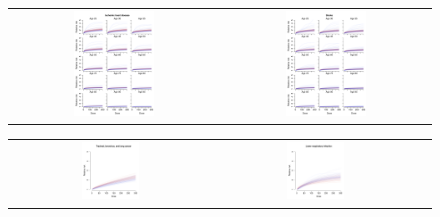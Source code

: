 \documentclass{article}
\begin{document}
\begin{appendix}
\begin{figure}[H]
\centering
\begin{tabular}{cc}
\includegraphics[width=0.4\textwidth]{cvd_ihdDR-sim.pdf}&
\includegraphics[width=0.4\textwidth]{cvd_strokeDR-sim.pdf}\\
\end{tabular}
\begin{tabular}{ccc}
\includegraphics[width=0.3\textwidth]{neo_lungDR-sim.pdf}&
\includegraphics[width=0.3\textwidth]{lriDR-sim.pdf}&

\end{tabular}
\end{figure}
\end{appendix}
\end{document}
